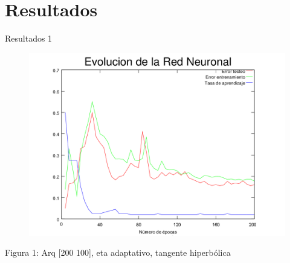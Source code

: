 \documentclass{beamer}
\begin{document}
\section{Resultados}

\begin{frame}{Resultados 1}
\begin{figure}[H]
\begin{center}
\includegraphics[scale=0.40]{../images/6.png}
\label{modelado}
\end{center}
\end{figure}

\begin{center}
\par Figura 1: Arq [200 100], eta adaptativo, tangente hiperbólica
\end{center}
\end{frame}
\end{document}
